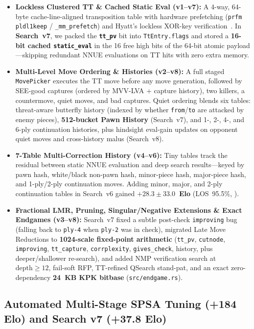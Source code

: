 \documentclass[10.5pt,letterpaper]{article}
\begin{document}
\begin{itemize}
    \item \textbf{Lockless Clustered TT \& Cached Static Eval (v1--v7):} A 4-way, 64-byte cache-line-aligned transposition table with hardware prefetching (\texttt{prfm pldl1keep} / \texttt{\_mm\_prefetch}) and Hyatt's lockless XOR-key verification~\cite{hyattlockless}. In \textbf{Search~v7}, we packed the \textbf{\texttt{tt\_pv}} bit into \texttt{TtEntry.flags} and stored a \textbf{16-bit cached \texttt{static\_eval}} in the 16 free high bits of the 64-bit atomic payload—skipping redundant NNUE evaluations on TT hits with zero extra memory.
    \item \textbf{Multi-Level Move Ordering \& Histories (v2--v8):} A full staged \texttt{MovePicker} executes the TT move before any move generation, followed by SEE-good captures (ordered by MVV-LVA + capture history), two killers, a countermove, quiet moves, and bad captures. Quiet ordering blends six tables: threat-aware butterfly history (indexed by whether \texttt{from}/\texttt{to} are attacked by enemy pieces), \textbf{512-bucket Pawn History} (Search~v7), and 1-, 2-, 4-, and 6-ply continuation histories, plus hindsight eval-gain updates on opponent quiet moves and cross-history malus (Search~v8).
    \item \textbf{7-Table Multi-Correction History (v4--v6):} Tiny tables track the residual between static NNUE evaluation and deep search results—keyed by pawn hash, white/black non-pawn hash, minor-piece hash, major-piece hash, and 1-ply/2-ply continuation moves. Adding minor, major, and 2-ply continuation tables in Search~v6 gained \textbf{$+28.3 \pm 33.0$~Elo} (LOS~95.5\%, ).
    \item \textbf{Fractional LMR, Pruning, Singular/Negative Extensions \& Exact Endgames (v3--v8):} Search~v7 fixed a subtle post-check \texttt{improving} bug (falling back to \texttt{ply-4} when \texttt{ply-2} was in check), migrated Late Move Reductions to \textbf{1024-scale fixed-point arithmetic} (\texttt{tt\_pv}, \texttt{cutnode}, \texttt{improving}, \texttt{tt\_capture}, \texttt{corrplexity}, \texttt{gives\_check}, history, plus deeper/shallower re-search), and added NMP verification search at $\text{depth} \ge 12$, fail-soft RFP, TT-refined QSearch stand-pat, and an exact zero-dependency \textbf{24~KB KPK bitbase} (\texttt{src/endgame.rs}).
\end{itemize}

\subsection{Automated Multi-Stage SPSA Tuning (+184 Elo) and Search v7 (+37.8 Elo)}
\end{document}
